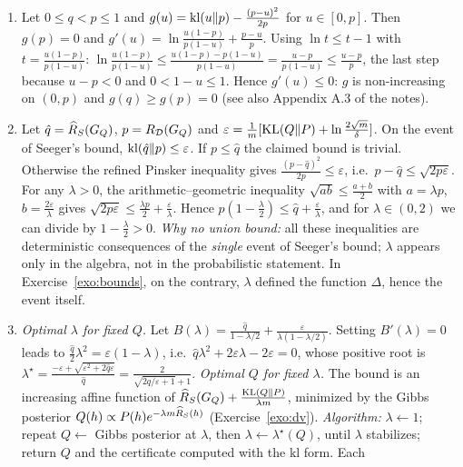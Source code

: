 \documentclass[11pt]{article}
\newcounter{exo}
\begin{document}
\begin{solution}
\begin{enumerate}
\item Let $0\leq q<p\leq1$ and $g(u)=\operatorname{kl}(u\|p)-\frac{(p-u)^2}{2p}$ for $u\in[0,p]$. Then $g(p)=0$ and
      $g'(u)=\ln\frac{u(1-p)}{p(1-u)}+\frac{p-u}{p}$. Using $\ln t\leq t-1$ with $t=\frac{u(1-p)}{p(1-u)}$:
      $\ln\frac{u(1-p)}{p(1-u)}\leq\frac{u(1-p)-p(1-u)}{p(1-u)}=\frac{u-p}{p(1-u)}\leq\frac{u-p}{p}$, the last step because
      $u-p<0$ and $0<1-u\leq1$. Hence $g'(u)\leq0$: $g$ is non-increasing on $(0,p)$ and $g(q)\geq g(p)=0$ (see also
      Appendix A.3 of the notes).
\item Let $\hat q=\widehat{R}_{S}(G_{Q})$, $p=R_{\mathcal{D}}(G_{Q})$ and $\varepsilon=\frac1m[\operatorname{KL}(Q\|P)+\ln\frac{2\sqrt m}\delta]$. On the event of Seeger's bound,
      $\operatorname{kl}(\hat q\|p)\leq\varepsilon$. If $p\leq\hat q$ the claimed bound is trivial. Otherwise the refined Pinsker inequality
      gives $\frac{(p-\hat q)^2}{2p}\leq\varepsilon$, i.e.\ $p-\hat q\leq\sqrt{2p\varepsilon}$. For any $\lambda>0$, the
      arithmetic--geometric inequality $\sqrt{ab}\leq\frac{a+b}2$ with $a=\lambda p$, $b=\frac{2\varepsilon}\lambda$ gives
      $\sqrt{2p\varepsilon}\leq\frac{\lambda p}2+\frac\varepsilon\lambda$. Hence $p(1-\frac\lambda2)\leq\hat q+\frac\varepsilon\lambda$, and for
      $\lambda\in(0,2)$ we can divide by $1-\frac\lambda2>0$. \emph{Why no union bound:} all these inequalities are
      deterministic consequences of the \emph{single} event of Seeger's bound; $\lambda$ appears only in the algebra,
      not in the probabilistic statement. In Exercise~\ref{exo:bounds}, on the contrary, $\lambda$ defined the function
      $\Delta$, hence the event itself.
\item \emph{Optimal $\lambda$ for fixed $Q$.} Let $B(\lambda)=\frac{\hat q}{1-\lambda/2}+\frac{\varepsilon}{\lambda(1-\lambda/2)}$. Setting
      $B'(\lambda)=0$ leads to $\frac{\hat q}{2}\lambda^2=\varepsilon(1-\lambda)$, i.e.\ $\hat q\lambda^2+2\varepsilon\lambda-2\varepsilon=0$, whose
      positive root is $\lambda^\star=\frac{-\varepsilon+\sqrt{\varepsilon^2+2\hat q\varepsilon}}{\hat q}=\frac{2}{\sqrt{2\hat q/\varepsilon+1}+1}$.
      \emph{Optimal $Q$ for fixed $\lambda$.} The bound is an increasing affine function of
      $\widehat{R}_{S}(G_{Q})+\frac{\operatorname{KL}(Q\|P)}{\lambda m}$, minimized by the Gibbs posterior $Q(h)\propto P(h)e^{-\lambda m\widehat{R}_{S}(h)}$
      (Exercise~\ref{exo:dv}). \emph{Algorithm:} $\lambda\leftarrow1$; repeat $Q\leftarrow$ Gibbs posterior at $\lambda$, then
      $\lambda\leftarrow\lambda^\star(Q)$, until $\lambda$ stabilizes; return $Q$ and the certificate computed with the kl form. Each

\end{enumerate}
\end{solution}
\end{document}
